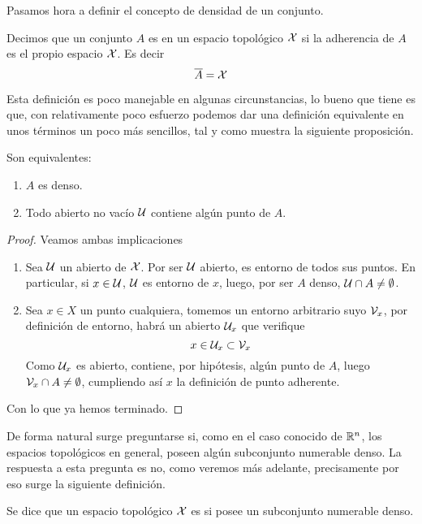 Pasamos hora a definir el concepto de densidad de un conjunto.
\begin{defi}
	\label{etop_def_denso}
	Decimos que un conjunto $A$ es  en un espacio topológico $\mathcal{X}$ si la adherencia de $A$ es el propio espacio $\mathcal{X}$. Es decir
	\begin{equation*}
		\overline{A}=\mathcal{X}
	\end{equation*}
\end{defi}
Esta definición es poco manejable en algunas circunstancias, lo bueno que tiene es que, con relativamente poco esfuerzo podemos dar una definición equivalente en unos términos un poco más sencillos, tal y como muestra la siguiente proposición.
\begin{prop}
	Son equivalentes:
	\begin{enumerate}
		\item $A$ es denso.
		\item Todo abierto no vacío $\mathcal{U}$ contiene algún punto de $A$.
	\end{enumerate}
\end{prop}
\begin{proof} Veamos ambas implicaciones
	\begin{enumerate}
		\item[\bra] Sea $\mathcal{U}$ un abierto de $\mathcal{X}$. Por ser $\mathcal{U}$ abierto, es entorno de todos sus puntos. En particular, si $x\in\mathcal{U}$, $\mathcal{U}$ es entorno de $x$, luego, por ser $A$ denso, $\mathcal{U}\cap A\not= \emptyset$.
		\item[\bla] Sea $x\in X$ un punto cualquiera, tomemos un entorno arbitrario suyo $\mathcal{V}_x$, por definición de entorno, habrá un abierto $\mathcal{U}_x$ que verifique
		\begin{equation*}
			x\in\mathcal{U}_x\subset\mathcal{V}_x
		\end{equation*}
		Como $\mathcal{U}_x$ es abierto, contiene, por hipótesis, algún punto de $A$, luego $\mathcal{V}_x\cap A\not=\emptyset$, cumpliendo así $x$ la definición de punto adherente.
	\end{enumerate}
	Con lo que ya hemos terminado.
\end{proof}
De forma natural surge preguntarse si, como en el caso conocido de $\mathbb{R}^n$, los espacios topológicos en general, poseen algún subconjunto numerable denso. La respuesta a esta pregunta es no, como veremos más adelante, precisamente por eso surge la siguiente definición.
\begin{defi}
	Se dice que un espacio topológico $\mathcal{X}$ es  si posee un subconjunto numerable denso.
\end{defi}

